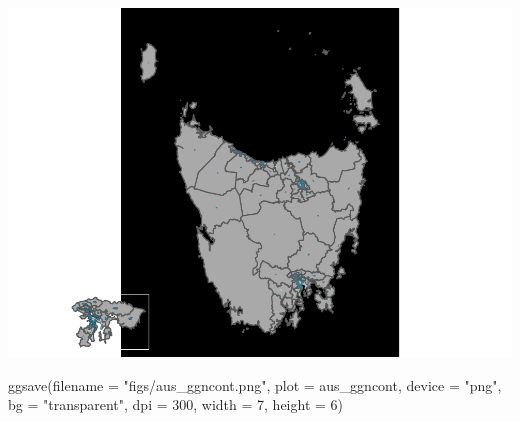 \begin{Schunk}
\includegraphics{kobakian-cook_files/figure-latex/unnamed-chunk-1-2} \begin{Sinput}
ggsave(filename = "figs/aus_ggncont.png", plot = aus_ggncont,
       device = "png", bg = "transparent", dpi = 300,  width = 7, height = 6)
\end{Sinput}
\end{Schunk}

